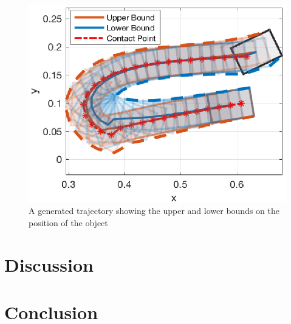 \documentclass[conference]{IEEEtran}
\begin{document}
\begin{figure}
\begin{center}
  \includegraphics[width=\columnwidth]{fig/trajectory.eps}
\end{center}
\caption{A generated trajectory showing the upper and lower bounds on the position of the object}
\label{fig:trajectory}
\end{figure}






\section{Discussion}

\section{Conclusion}



\end{document}
